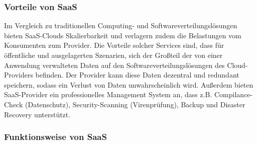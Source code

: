 \subsubsection*{Vorteile von SaaS}

Im Vergleich zu traditionellen Computing- und Softwareverteilungslösungen bieten SaaS-Clouds Skalierbarkeit und verlagern zudem die Belastungen vom Konsumenten zum Provider.
Die Vorteile solcher Services sind, dass für öffentliche und ausgelagerten Szenarien, sich der Großteil der von einer Anwendung verwalteten Daten auf den Softwareverteilungslösungen
des Cloud-Providers befinden. Der Provider kann diese Daten dezentral und redundant speichern, sodass ein Verlust von Daten unwahrscheinlich wird. Außerdem bieten SaaS-Provider
ein professionelles Management System an, dass z.B. Compilance-Check (Datenschutz), Security-Scanning (Virenprüfung), Backup und Disaster Recovery unterstützt.

\subsubsection*{Funktionsweise von SaaS}

